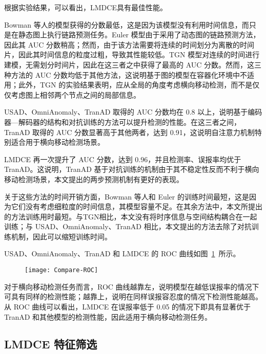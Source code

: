 {根据实验结果，可以看出，LMDCE具有最佳性能。

Bowman 等人的模型获得的分数最低，这是因为该模型没有利用时间信息，而只是在静态图上执行链路预测任务。Euler 模型由于采用了动态图的链路预测方法，因此其 AUC 分数稍高；然而，由于该方法需要将连续的时间划分为离散的时间片，因此其时间信息的粒度过粗，导致其性能较低。TGN 模型对连续的时间进行建模，无需划分时间片，因此在这三者之中获得了最高的 AUC 分数。然而，这三种方法的 AUC 分数均低于其他方法，这说明基于图的模型在容器化环境中不适用；此外，TGN 的实验结果表明，应从全局的角度考虑横向移动检测，而不是仅仅考虑图上相邻两个节点之间的局部信息。

USAD、OmniAnomaly、TranAD 取得的 AUC 分数均在 0.8 以上，说明基于编码器—解码器的结构和对抗训练的方法可以提升检测的性能。在这三者之间，TranAD 取得的 AUC 分数显著高于其他两者，达到 0.91，这说明自注意力机制特别适合用于横向移动检测场景。

LMDCE 再一次提升了 AUC 分数，达到 0.96，并且检测率、误报率均优于 TranAD。这说明，TranAD 基于对抗训练的机制由于其不稳定性反而不利于横向移动检测场景，本文提出的两步预测机制有更好的表现。

关于这些方法的时间开销方面，Bowman 等人和 Euler 的训练时间最短，这是因为它们没有考虑细粒度的时间信息，其模型容量不足。在其余方法中，本文所提出的方法训练用时最短。与TGN相比，本文没有将时序信息与空间结构耦合在一起训练；与 USAD、OmniAnomaly、TranAD 相比，本文提出的方法去除了对抗训练机制，因此可以缩短训练时间。

USAD、OmniAnomaly、TranAD 和 LMDCE 的 ROC 曲线如图~\ref{fig:compare-roc}~所示。

\begin{figure}[t]
    \centering
    \texttt{[image: Compare-ROC]}
    \label{fig:compare-roc}

\end{figure}

对于横向移动检测任务而言，ROC 曲线越靠左，说明模型在越低误报率的情况下可具有同样的检测性能；越靠上，说明在同样误报容忍度的情况下检测性能越高。从 ROC 曲线可以看出，LMDCE 在误报率低于 0.05 的情况下即具有显著优于 TranAD 和其他模型的检测性能，因此适用于横向移动检测任务。

\subsection{LMDCE 特征筛选}
\label{sec:feature-filter}

}
